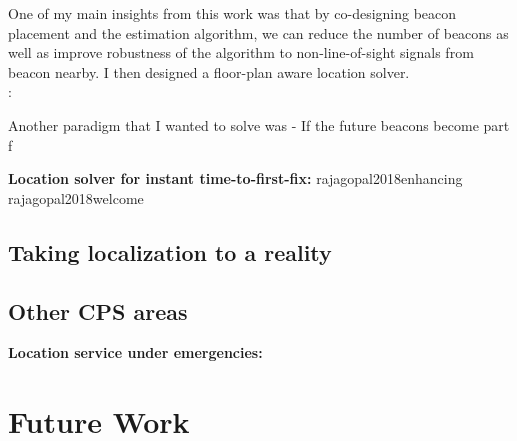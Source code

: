 \documentclass[10pt]{article}
\begin{document}
One of my main insights from this work was that by co-designing beacon placement and the estimation algorithm, we can reduce the number of beacons as well as improve robustness of the algorithm to non-line-of-sight signals from beacon nearby.  I then designed a floor-plan aware location solver.\\

\textbf{}:


Another paradigm that I wanted to solve was - If the future beacons become part f

\textbf{Location solver for instant time-to-first-fix: }
rajagopal2018enhancing
rajagopal2018welcome


\subsection{Taking localization to a reality}
\subsection{Other CPS areas}
\textbf{Location service under emergencies: }

\section{Future Work}
\end{document}

